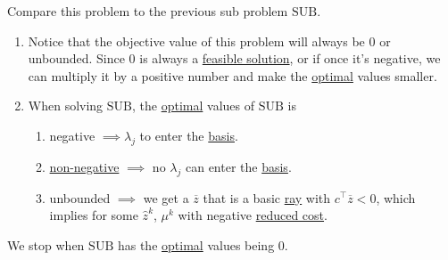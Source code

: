 \begin{prev}
\begin{enumerate}
		      \begin{remark}
			      Compare this problem to the previous sub problem \(\mathrm{SUB}\).
			      \begin{enumerate}
				      \item Notice that the objective value of this problem will always be \(0\) or unbounded. Since \(0\) is always a \hyperref[def:feasible-solution]{feasible solution},
				            or if once it's negative, we can multiply it by a positive number and make the \hyperref[def:optimal-solution]{optimal} values smaller.
				      \item When solving \(\mathrm{SUB}\), the \hyperref[def:optimal-solution]{optimal} values of \(\mathrm{SUB}\) is
				            \begin{enumerate}
					            \item negative \(\implies \lambda_{j}\) to enter the \hyperref[def:basic]{basis}.
					            \item \underline{non-negative} \(\implies\) no \(\lambda_{j}\) can enter the \hyperref[def:basic]{basis}.
					            \item unbounded \(\implies\) we get a \(\overline{z}\) that is a basic \hyperref[def:ray]{ray} with \(c^{\top}\overline{z} <0\), which implies for
					                  some \(\hat{z}^k\), \(\mu^k\) with negative \hyperref[def:reduced-cost]{reduced cost}.
				            \end{enumerate}
			      \end{enumerate}
			      \begin{note}
				      We stop when \(\mathrm{SUB}\) has the \hyperref[def:optimal-solution]{optimal} values being \(0\).
			      \end{note}
		      \end{remark}
	\end{enumerate}
\end{prev}

